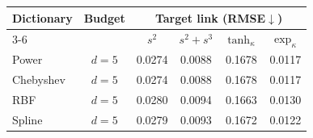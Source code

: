 \begin{tabular}{@{}lccccc@{}}
\toprule
Dictionary & Budget & \multicolumn{4}{c}{Target link (RMSE$\downarrow$)} \\
\cmidrule(l){3-6}
 & & $s^2$ & $s^2+s^3$ & $\tanh_\kappa$ & $\exp_\kappa$ \\
\midrule
Power & $d=5$ & 0.0274 & 0.0088 & 0.1678 & 0.0117 \\
Chebyshev & $d=5$ & 0.0274 & 0.0088 & 0.1678 & 0.0117 \\
RBF & $d=5$ & 0.0280 & 0.0094 & 0.1663 & 0.0130 \\
Spline & $d=5$ & 0.0279 & 0.0093 & 0.1672 & 0.0122 \\
\bottomrule
\end{tabular}

